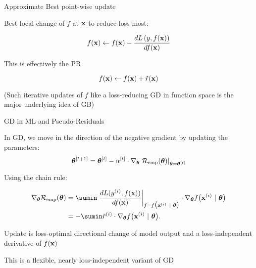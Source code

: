 \documentclass[11pt,compress,t,notes=noshow, xcolor=table]{beamer}
\begin{document}
\begin{framei}[sep=M, fs=normal]{Approximate Best point-wise update}

\item Best local change of $f$ at $\mathbf{x}$ to reduce loss most:

$$
f(\mathbf{x}) \leftarrow f(\mathbf{x}) - \frac{d L\left(y, f(\mathbf{x})\right)}{d f(\mathbf{x})} 
$$

\item This is effectively the PR 

$$
f(\mathbf{x}) \leftarrow f(\mathbf{x}) + \tilde{r}(\mathbf{x})
$$

\item (Such iterative updates of $f$ like a loss-reducing GD in function space is the major underlying idea of GB)

\end{framei}


\begin{framei}[sep=M]{GD in ML and Pseudo-Residuals}

\item In GD, we move in the direction of the negative gradient by updating the parameters: 
$$\bm{\theta}^{[t + 1]} = \bm{\theta}^{[t]} - \alpha^{[t]} \cdot \nabla_{\bm{\theta}} \left.\mathcal{R}_{\text{emp}}(\bm{\theta})\right|_{\bm{\theta} = \bm{\theta}^{[t]}}	$$

\item Using the chain rule:

\begin{align*}
\nabla_{\thetav} \risket &=\sumin \left.\frac{d L(\yi, \fx)}{d \fx} \right|_{f = \fxit} 
\cdot \nabla_{\thetav} \fxit \\ 
&= - \sumin \tilde r^{(i)} \cdot \nabla_{\thetav} \fxit.
\end{align*}
\item Update is loss-optimal directional change of model output 
and a loss-independent derivative of $f(\mathbf{x})$
\item This is a flexible, nearly loss-independent variant of GD

\end{framei}
\end{document}
